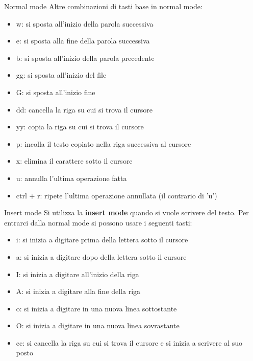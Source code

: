\documentclass{beamer}
\begin{document}
\begin{frame}{Normal mode}
  Altre combinazioni di tasti base in normal mode:
  \begin{itemize}
    \item w: si sposta all'inizio della parola successiva
    \item e: si sposta alla fine della parola successiva
    \item b: si sposta all'inizio della parola precedente
    \item gg: si sposta all'inizio del file
    \item G: si sposta all'inizio fine
    \item dd: cancella la riga su cui si trova il cursore
    \item yy: copia la riga su cui si trova il cursore
    \item p: incolla il testo copiato nella riga successiva al cursore
    \item x: elimina il carattere sotto il cursore
    \item u: annulla l'ultima operazione fatta
    \item ctrl + r: ripete l'ultima operazione annullata (il contrario di 'u')
  \end{itemize}
\end{frame}

\begin{frame}{Insert mode}
  Si utilizza la \textbf{insert mode} quando si vuole scrivere del testo. Per
  entrarci dalla normal mode si possono usare i seguenti tasti:
  \begin{itemize}
    \item i: si inizia a digitare prima della lettera sotto il cursore
    \item a: si inizia a digitare dopo della lettera sotto il cursore
    \item I: si inizia a digitare all'inizio della riga
    \item A: si inizia a digitare alla fine della riga
    \item o: si inizia a digitare in una nuova linea sottostante
    \item O: si inizia a digitare in una nuova linea sovrastante
    \item cc: si cancella la riga su cui si trova il cursore e si inizia a 
      scrivere al suo posto
  \end{itemize}
\end{frame}
\end{document}

